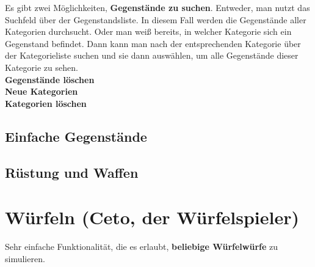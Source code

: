 \documentclass[11pt, a4paper, german]{article}
\begin{document}
Es gibt zwei Möglichkeiten, \textbf{Gegenstände zu suchen}. Entweder, man nutzt das Suchfeld über der Gegenstandsliste. In diesem Fall werden die Gegenstände aller Kategorien durchsucht. Oder man weiß bereits, in welcher Kategorie sich ein Gegenstand befindet. Dann kann man nach der entsprechenden Kategorie über der Kategorieliste suchen und sie dann auswählen, um alle Gegenstände dieser Kategorie zu sehen. \\
\textbf{Gegenstände löschen}\\
\textbf{Neue Kategorien}\\
\textbf{Kategorien löschen}
\subsection{Einfache Gegenstände}
\subsection{Rüstung und Waffen}

\clearpage
\section{Würfeln (Ceto, der Würfelspieler)}
Sehr einfache Funktionalität, die es erlaubt, \textbf{beliebige Würfelwürfe} zu simulieren.
\end{document}

